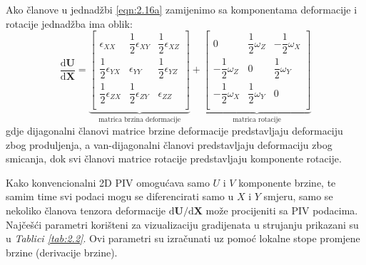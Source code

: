 Ako članove u jednadžbi \ref{eqn:2.16a} zamijenimo sa komponentama deformacije i rotacije jednadžba ima oblik:
\begin{equation}
	\dfrac{\mathrm{d}\boldsymbol{U}}{\mathrm{d}\boldsymbol{X}} = 
	\underbrace{\begin{bmatrix}
			\epsilon_{XX}       &   \dfrac{1}{2}\epsilon_{XY}       &   \dfrac{1}{2}\epsilon_{XZ}       \\
			\dfrac{1}{2}\epsilon_{YX}       &   \epsilon_{YY}       &   \dfrac{1}{2}\epsilon_{YZ}       \\   
			\dfrac{1}{2}\epsilon_{ZX}       &   \dfrac{1}{2}\epsilon_{ZY}       &   \epsilon_{ZZ}       \\
	\end{bmatrix}}_{\text{matrica brzina deformacije}} + 
	\underbrace{\begin{bmatrix}
			0       &   \dfrac{1}{2}\omega_{Z}       &   -\dfrac{1}{2}\omega_{X}       \\
			-\dfrac{1}{2}\omega_{Z}       &   0       &   \dfrac{1}{2}\omega_{Y}       \\   
			-\dfrac{1}{2}\omega_{X}       &   \dfrac{1}{2}\omega_{Y}       &   0       \\
	\end{bmatrix}}_{\text{matrica rotacije}}
	\label{eqn:2.17}
\end{equation}
gdje dijagonalni članovi matrice brzine deformacije predstavljaju deformaciju zbog produljenja, a van-dijagonalni članovi predstavljaju deformaciju zbog smicanja, dok svi članovi matrice rotacije predstavljaju komponente rotacije.
\par
Kako konvencionalni 2D PIV omogućava samo $U$ i $V$ komponente brzine, te samim time svi podaci mogu se diferencirati samo u $X$ i $Y$ smjeru, samo se nekoliko članova tenzora deformacije $\mathrm{d}\boldsymbol{U}/\mathrm{d}\boldsymbol{X}$ može procijeniti sa PIV podacima. Najčešći parametri korišteni za vizualizaciju gradijenata u strujanju prikazani su u \textit{Tablici \ref{tab:2.2}}. Ovi parametri su izračunati uz pomoć lokalne stope promjene brzine (derivacije brzine).
